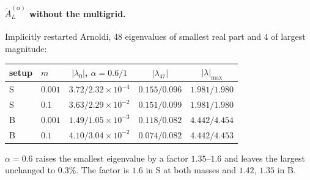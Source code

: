 \documentclass[11pt,a4paper]{article}
\newcommand{\AL}{\tilde A_{L}}
\begin{document}
\paragraph{\texorpdfstring{$\AL^{(\alpha)}$}{A_L} without the multigrid.} Implicitly restarted Arnoldi, 48
eigenvalues of smallest real part and 4 of largest magnitude:
\begin{center}
\begin{tabular}{@{}llccc@{}}
\toprule
setup & $m$ & $|\lambda_0|$, $\alpha=0.6/1$ & $|\lambda_{47}|$ & $|\lambda|_{\max}$\\
\midrule
S & $0.001$ & $3.72/2.32\times10^{-4}$ & $0.155/0.096$ & $1.981/1.980$\\
S & $0.1$   & $3.63/2.29\times10^{-2}$ & $0.151/0.099$ & $1.981/1.980$\\
B & $0.001$ & $1.49/1.05\times10^{-3}$ & $0.118/0.082$ & $4.442/4.454$\\
B & $0.1$   & $4.10/3.04\times10^{-2}$ & $0.074/0.082$ & $4.442/4.453$\\
\bottomrule
\end{tabular}
\end{center}
$\alpha=0.6$ raises the smallest eigenvalue by a factor $1.35$--$1.6$ and leaves the largest
unchanged to $0.3\%$. The factor is $1.6$ in S at both masses and $1.42$, $1.35$ in B.
\end{document}
